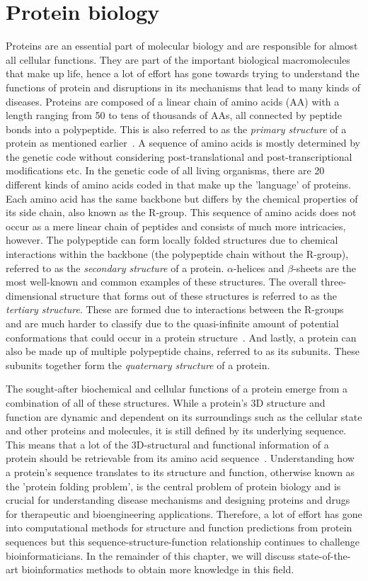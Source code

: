 \section{Protein biology}
Proteins are an essential part of molecular biology and are responsible for almost all cellular functions. They are part of the important biological macromolecules that make up life, hence a lot of effort has gone towards trying to understand the functions of protein and disruptions in its mechanisms that lead to many kinds of diseases. Proteins are composed of a linear chain of amino acids (AA) with a length ranging from 50 to tens of thousands of AAs, all connected by peptide bonds into a polypeptide. This is also referred to as the \textit{primary structure} of a protein as mentioned earlier~\cite{primstruct}. A sequence of amino acids is mostly determined by the genetic code without considering post-translational and post-transcriptional modifications etc. In the genetic code of all living organisms, there are 20 different kinds of amino acids coded in that make up the 'language' of proteins. Each amino acid has the same backbone but differs by the chemical properties of its side chain, also known as the R-group. This sequence of amino acids does not occur as a mere linear chain of peptides and consists of much more intricacies, however. The polypeptide can form locally folded structures due to chemical interactions within the backbone (the polypeptide chain without the R-group), referred to as the \textit{secondary structure} of a protein. $\alpha$-helices and $\beta$-sheets are the most well-known and common examples of these structures. The overall three-dimensional structure that forms out of these structures is referred to as the \textit{tertiary structure}. These are formed due to interactions between the R-groups and are much harder to classify due to the quasi-infinite amount of potential conformations that could occur in a protein structure~\cite{folding}. And lastly, a protein can also be made up of multiple polypeptide chains, referred to as its subunits. These subunits together form the \textit{quaternary structure} of a protein.

The sought-after biochemical and cellular functions of a protein emerge from a combination of all of these structures. While a protein's 3D structure and function are dynamic and dependent on its surroundings such as the cellular state and other proteins and molecules, it is still defined by its underlying sequence. This means that a lot of the 3D-structural and functional information of a protein should be retrievable from its amino acid sequence~\cite{structure}. Understanding how a protein's sequence translates to its structure and function, otherwise known as the 'protein folding problem', is the central problem of protein biology and is crucial for understanding disease mechanisms and designing proteins and drugs for therapeutic and bioengineering applications. Therefore, a lot of effort has gone into computational methods for structure and function predictions from protein sequences but this sequence-structure-function relationship continues to challenge bioinformaticians. In the remainder of this chapter, we will discuss state-of-the-art bioinformatics methods to obtain more knowledge in this field.

